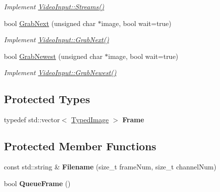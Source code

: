 \begin{DoxyCompactItemize}
\begin{DoxyCompactList}\small\item\em Implement \hyperlink{structpangolin_1_1_video_input_a9030d775d699c39ab7b7ba378c007c6a}{Video\+Input\+::\+Streams()} \end{DoxyCompactList}\item 
bool \hyperlink{classpangolin_1_1_images_video_a2f305910d2362778bfb96266f3701a75}{Grab\+Next} (unsigned char $\ast$image, bool wait=true)\hypertarget{classpangolin_1_1_images_video_a2f305910d2362778bfb96266f3701a75}{}\label{classpangolin_1_1_images_video_a2f305910d2362778bfb96266f3701a75}

\begin{DoxyCompactList}\small\item\em Implement \hyperlink{structpangolin_1_1_video_input_ad3d8ff59c1ec4139320097e6e1111f32}{Video\+Input\+::\+Grab\+Next()} \end{DoxyCompactList}\item 
bool \hyperlink{classpangolin_1_1_images_video_ad052b1e0e619b077517d3e6bab3c6e95}{Grab\+Newest} (unsigned char $\ast$image, bool wait=true)\hypertarget{classpangolin_1_1_images_video_ad052b1e0e619b077517d3e6bab3c6e95}{}\label{classpangolin_1_1_images_video_ad052b1e0e619b077517d3e6bab3c6e95}

\begin{DoxyCompactList}\small\item\em Implement \hyperlink{structpangolin_1_1_video_input_a4c8ac38e3c6a3f591663aeebf645e4c6}{Video\+Input\+::\+Grab\+Newest()} \end{DoxyCompactList}\end{DoxyCompactItemize}
\subsection*{Protected Types}
\begin{DoxyCompactItemize}
\item 
typedef std\+::vector$<$ \hyperlink{structpangolin_1_1_typed_image}{Typed\+Image} $>$ {\bfseries Frame}\hypertarget{classpangolin_1_1_images_video_ab9c3021c7ee3b34f3edec5365b8fb0f1}{}\label{classpangolin_1_1_images_video_ab9c3021c7ee3b34f3edec5365b8fb0f1}

\end{DoxyCompactItemize}
\subsection*{Protected Member Functions}
\begin{DoxyCompactItemize}
\item 
const std\+::string \& {\bfseries Filename} (size\+\_\+t frame\+Num, size\+\_\+t channel\+Num)\hypertarget{classpangolin_1_1_images_video_ab81f79c9898a7875e9f722a6e256f874}{}\label{classpangolin_1_1_images_video_ab81f79c9898a7875e9f722a6e256f874}

\item 
bool {\bfseries Queue\+Frame} ()\hypertarget{classpangolin_1_1_images_video_aec99bab01c6f66abc063a28ac25039eb}{}\label{classpangolin_1_1_images_video_aec99bab01c6f66abc063a28ac25039eb}

\end{DoxyCompactItemize}
